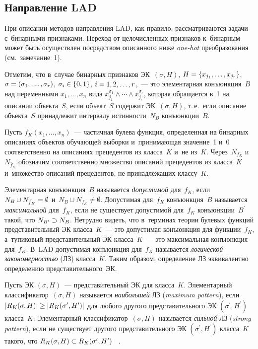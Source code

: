 \begin{multicols}{2}
\section{Направление LAD}

  При описании методов на\-прав\-ле\-ния LAD, как правило, рас\-смат\-ри\-ва\-ют\-ся 
задачи с~бинарными при\-зна\-ка\-ми. Переход от це\-ло\-чис\-лен\-ных признаков 
к~бинарным может быть осуществлен по\-средст\-вом описанного ниже  
\textit{one-hot} преобразования (см.\ замечание~1). 
  
  Отметим, что в~случае бинарных при\-зна\-ков ЭК~$(\sigma, H)$, $H\hm= \{ 
x_{j_1}, \ldots , x_{j_r}\}$, $\sigma\hm= (\sigma_1, \ldots , \sigma_r)$, 
$\sigma_i\hm\in \{0,1\}$, $i\hm=1,2,\ldots , r$,~--- это элементарная 
конъюнкция~$B$ над переменными $x_1, \ldots , x_n$ вида 
$x^{\sigma_1}_{j_1}\wedge \cdots \wedge x^{\sigma_r}_{j_r}$, которая 
обращается в~1 на описании объекта~$S$, если объект~$S$ содержит ЭК~$(\sigma, H)$, 
т.\,е.\ если описание объекта~$S$ принадлежит интервалу 
ис\-тин\-ности~$N_B$ конъюнкции~$B$.
  
  Пусть $f_K(x_1, \ldots , x_n)$~--- час\-тич\-ная булева функция, определенная на 
бинарных описаниях объектов обуча\-ющей выборки и~при\-ни\-ма\-ющая 
значение~1 и~0 соответственно на описаниях прецедентов из класса~$K$ и~не 
из~$K$. Через~$N_{f_K}$ и~$N_{\bar{f}_K}$ обозначим соответственно 
множество описаний прецедентов из класса~$K$ и~множество описаний 
прецедентов, не принадлежащих клас\-су~$K$. 
  
  Элементарная конъюнкция~$B$ называется \textit{до\-пус\-ти\-мой} 
для~$f_K$, если $N_B\cup N_{\bar{f}_K}\hm= \emptyset$ и~$N_B\cup 
N_{f_K}\not=\emptyset$. До\-пус\-ти\-мая для~$f_K$ конъюнкция~$B$ называется 
\textit{максимальной} для~$f_K$, если не существует до\-пус\-ти\-мой для~$f_K$ 
конъюнкции~$B^\prime$ такой, что $N_{B^\prime} \hm\supset N_B$. Нетрудно 
видеть, что в~терминах тео\-рии булевых функций пред\-ста\-ви\-тель\-ный ЭК 
класса~$K$~--- это до\-пус\-ти\-мая конъюнкция для функции~$f_K$, а~тупиковый 
представительный ЭК класса~$K$~--- это максимальная конъюнкция 
для~$f_K$. В~LAD до\-пус\-ти\-мая конъюнкция для~$f_K$ называется 
\textit{логической за\-ко\-но\-мер\-ностью} (ЛЗ) класса~$K$. Таким образом, 
определение ЛЗ эквивалентно определению 
представительного~ЭК. 
  
  Пусть ЭК $(\sigma, H)$~--- представительный ЭК для класса~$K$. Элементарный 
классификатор~$(\sigma, H)$ называется \textit{наибольшей} ЛЗ (\textit{maximum pattern}), если 
  $\vert R_K (\sigma, H) \vert \hm\geq \vert R_K(\sigma^\prime, H^\prime)\vert$ 
для любого другого пред\-ста\-ви\-тель\-но\-го ЭК $(\sigma^\prime, H^\prime)$ 
класса~$K$. Элементарный 
классификатор~$(\sigma, H)$ называется \textit{сильной} ЛЗ (\textit{strong 
pattern}), если не существует другого представительного ЭК $(\sigma^\prime, 
H^\prime)$ класса~$K$ такого, что $ R_K(\sigma, H) \hm\subset 
R_K(\sigma^\prime, H^\prime)$ ~\cite{18-duk}.
  

\end{multicols}
